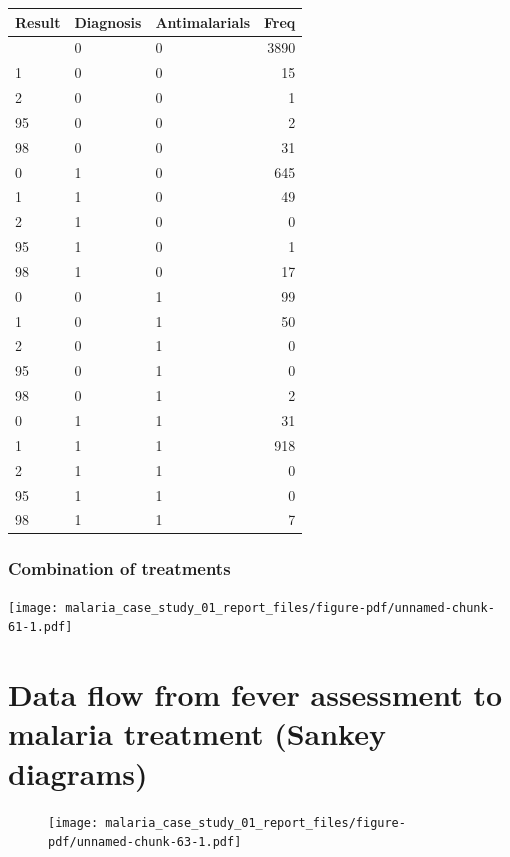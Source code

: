 \documentclass[
  letterpaper,
  DIV=11,
  numbers=noendperiod,
  oneside]{scrreprt}
\begin{document}
\begin{longtable}[]{@{}lllr@{}}
\toprule\noalign{}
Result & Diagnosis & Antimalarials & Freq \\
\midrule\noalign{}
\endhead
\bottomrule\noalign{}
\endlastfoot
0 & 0 & 0 & 3890 \\
1 & 0 & 0 & 15 \\
2 & 0 & 0 & 1 \\
95 & 0 & 0 & 2 \\
98 & 0 & 0 & 31 \\
0 & 1 & 0 & 645 \\
1 & 1 & 0 & 49 \\
2 & 1 & 0 & 0 \\
95 & 1 & 0 & 1 \\
98 & 1 & 0 & 17 \\
0 & 0 & 1 & 99 \\
1 & 0 & 1 & 50 \\
2 & 0 & 1 & 0 \\
95 & 0 & 1 & 0 \\
98 & 0 & 1 & 2 \\
0 & 1 & 1 & 31 \\
1 & 1 & 1 & 918 \\
2 & 1 & 1 & 0 \\
95 & 1 & 1 & 0 \\
98 & 1 & 1 & 7 \\
\end{longtable}

\hypertarget{combination-of-treatments}{%
\subsubsection{Combination of
treatments}\label{combination-of-treatments}}

\texttt{[image: malaria\_case\_study\_01\_report\_files/figure-pdf/unnamed-chunk-61-1.pdf]}

\hypertarget{data-flow-from-fever-assessment-to-malaria-treatment-sankey-diagrams}{%
\section{Data flow from fever assessment to malaria treatment (Sankey
diagrams)}\label{data-flow-from-fever-assessment-to-malaria-treatment-sankey-diagrams}}

\begin{figure}

\texttt{[image: malaria\_case\_study\_01\_report\_files/figure-pdf/unnamed-chunk-63-1.pdf]}

\end{figure}
\end{document}
